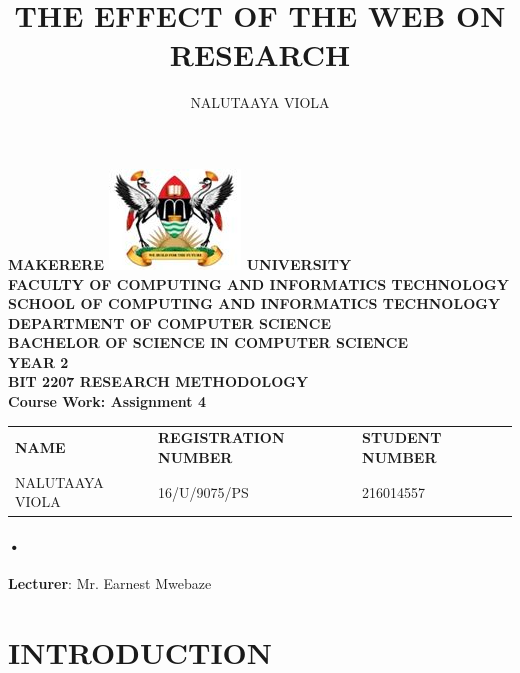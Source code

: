 \documentclass[7pt]{article}
\begin{document}
\begin{Huge}
\begin{center}
\begin{normalsize}
\textbf{MAKERERE \includegraphics[scale=0.5]{logo} UNIVERSITY }\\

\textbf{FACULTY OF COMPUTING AND INFORMATICS TECHNOLOGY} \\
\textbf{SCHOOL OF COMPUTING AND INFORMATICS TECHNOLOGY} \\
\textbf{DEPARTMENT OF COMPUTER SCIENCE} \\
\textbf{BACHELOR OF SCIENCE IN COMPUTER SCIENCE} \\
\textbf{YEAR 2} \\
\textbf{BIT 2207 RESEARCH METHODOLOGY} \\
\textbf{Course Work: Assignment 4}\\
\end{normalsize}
\end{center}
\end{Huge}

\begin{center}
\begin{tabular}{l l l}
\textbf{NAME}  & \textbf{REGISTRATION NUMBER} & \textbf{STUDENT NUMBER} \\
NALUTAAYA VIOLA& 16/U/9075/PS & 216014557 \\
\end{tabular}

\paragraph{•}
\textbf{Lecturer}: Mr. Earnest Mwebaze
\end{center}

\newpage

\title{THE EFFECT OF THE WEB ON RESEARCH}
\author{NALUTAAYA VIOLA}      
\renewcommand{\today}{}

\maketitle

\section{INTRODUCTION}
\end{document}
